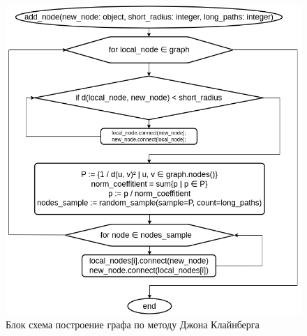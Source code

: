 \begin{figure}[H]
    \centering
    \includegraphics[scale=0.6]{./pictures/Kleinberg_add_node.png}
    \caption{Блок схема построение графа по методу Джона Клайнберга} \label{Kleinberg_graph_block_scheme}
\end{figure}



